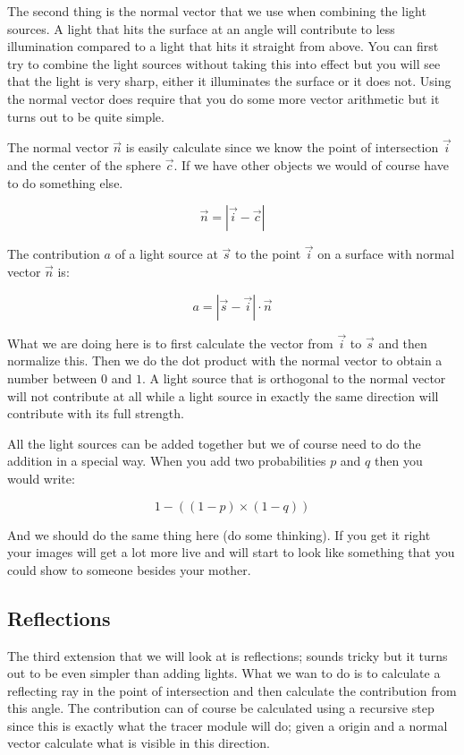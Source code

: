 \documentclass[a4paper,11pt]{article}
\begin{document}
The second thing is the normal vector that we use when
combining the light sources. A light that hits the surface at an angle
will contribute to less illumination compared to a light that hits it
straight from above. You can first try to combine the light sources
without taking this into effect but you will see that the light is
very sharp, either it illuminates the surface or it does not. Using
the normal vector does require that you do some more vector
arithmetic but it turns out to be quite simple.

The normal vector $\vec{n}$ is easily calculate since we know the point
of intersection $\vec{i}$ and the center of the sphere $\vec{c}$. If
we have other objects we would of course have to do something else.

$$ \vec{n} = |\vec{i} - \vec{c}| $$

The contribution $a$ of a light source at $\vec{s}$ to the point
$\vec{i}$ on a surface with normal vector $\vec{n}$ is:

$$a =  |\vec{s} - \vec{i}| \cdot \vec{n}$$

What we are doing here is to first calculate the vector from $\vec{i}$
to $\vec{s}$ and then normalize this. Then we do the dot product with
the normal vector to obtain a number between $0$ and $1$.  A light
source that is orthogonal to the normal vector will not contribute at
all while a light source in exactly the same direction will contribute
with its full strength.

All the light sources can be added together but we of course need to
do the addition in a special way. When you add two probabilities $p$
and $q$ then you would write:

$$ 1 - ((1-p) \times (1-q))$$

And we should do the same thing here (do some thinking). If you get it
right your images will get a lot more live and will start to look like
something that you could show to someone besides your mother.

\subsection*{Reflections}

The third extension that we will look at is reflections; sounds tricky
but it turns out to be even simpler than adding lights. What we wan to
do is to calculate a reflecting ray in the point of intersection and
then calculate the contribution from this angle. The contribution can
of course be calculated using a recursive step since this is exactly
what the tracer module will do; given a origin and a normal vector
calculate what is visible in this direction. 
\end{document}

